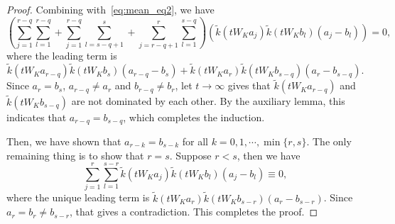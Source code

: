 \documentclass[10pt,a4paper]{amsart}
\begin{document}
\begin{proof}
Combining with~\eqref{eq:mean_eq2}, we have
\begin{equation}
    (\sum_{j=1}^{r-q}\sum_{l=1}^{r-q}+\sum_{j=1}^{r-q}\sum_{l=s-q+1}^s+\sum_{j=r-q+1}^{r}\sum_{l=1}^{s-q}) \left(\tilde k(tW_Ka_j)\tilde k(tW_Kb_l)(a_j-b_l)\right)=0,
\end{equation}
where the leading term is
\begin{equation}
    \tilde k(tW_Ka_{r-q})\tilde k(tW_Kb_{s})(a_{r-q}-b_{s})+\tilde k(tW_Ka_{r})\tilde k(tW_Kb_{s-q})(a_{r}-b_{s-q}).
\end{equation}
Since $a_r=b_s$, $a_{r-q}\neq a_r$ and $b_{r-q}\neq b_r$, let $t\to\infty$ gives that
$\tilde k(tW_Ka_{r-q})$ and $\tilde k(tW_Kb_{s-q})$ are not dominated by each other. By the auxiliary lemma, this indicates that $a_{r-q}=b_{s-q}$, which completes the induction.

Then, we have shown that $a_{r-k}=b_{s-k}$ for all $k=0, 1,\cdots, \min\{r,s\}$. The only remaining thing is to show that $r=s$. Suppose $r<s$, then we have
\begin{equation}
    \sum_{j=1}^r\sum_{l=1}^{s-r} \tilde k(tW_Ka_j)\tilde k(tW_Kb_l)(a_j-b_l)\equiv 0,
\end{equation}
where the unique leading term is $\tilde k(tW_Ka_r)\tilde k(tW_Kb_{s-r})(a_r-b_{s-r})$. Since $a_r=b_r\neq b_{s-r}$, that gives a contradiction.
This completes the proof.
\end{proof}
\end{document}
